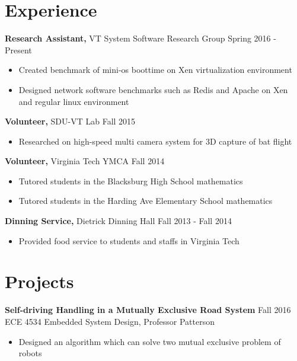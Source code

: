 \documentclass[margin]{res}
\begin{document}
\begin{resume}
  
\section{Experience} %

 {\bf Research Assistant,} VT System Software Research Group \hfill Spring 2016 - Present
 \begin{itemize} \itemsep -2pt  %
 \item Created benchmark of mini-os boottime on Xen virtualization environment
 \item Designed network software benchmarks such as Redis and Apache on Xen and 
 	regular linux environment
 \end{itemize}

{\bf Volunteer,} SDU-VT Lab \hfill  Fall 2015
\begin{itemize} \itemsep -2pt %
\item Researched on high-speed multi camera system for 3D capture of bat flight
\end{itemize}

{\bf Volunteer,} Virginia Tech YMCA  \hfill
Fall 2014                
                \begin{itemize} \itemsep -2pt
                 \item  Tutored students in the Blacksburg High School mathematics
                
                 \item Tutored students in the Harding Ave Elementary School mathematics

		 \end{itemize}
		 
{\bf Dinning Service,} Dietrick Dinning Hall \hfill  Fall 2013 - Fall 2014
\begin{itemize} \itemsep -2pt %
\item Provided food service to students and staffs in Virginia Tech
\end{itemize}


\section{Projects} 
               {\bf Self-driving Handling in a Mutually Exclusive Road System}     \hfill         Fall 2016  \\           
                {ECE 4534 Embedded System Design, Professor Patterson} 
                 \begin{itemize} \itemsep -2pt
                 \item Designed an algorithm which can solve two mutual exclusive problem of robots
                 

\end{itemize}
\end{resume}
\end{document}
